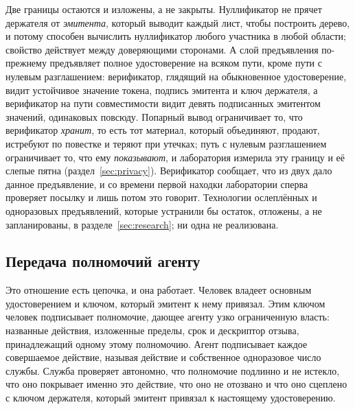 Две границы остаются и изложены, а не закрыты. Нуллификатор не прячет держателя от
\emph{эмитента}, который выводит каждый лист, чтобы построить дерево, и потому способен вычислить
нуллификатор любого участника в любой области; свойство действует между доверяющими сторонами. А
слой предъявления по-прежнему предъявляет полное удостоверение на всяком пути, кроме пути с нулевым
разглашением: верификатор, глядящий на обыкновенное удостоверение, видит устойчивое значение
токена, подпись эмитента и ключ держателя, а верификатор на пути совместимости видит девять
подписанных эмитентом значений, одинаковых повсюду. Попарный вывод ограничивает то, что верификатор
\emph{хранит}, то есть тот материал, который объединяют, продают, истребуют по повестке и теряют
при утечках; путь с нулевым разглашением ограничивает то, что ему \emph{показывают}, и лаборатория
измерила эту границу и её слепые пятна (раздел~\ref{sec:privacy}). Верификатор сообщает, что из
двух дало данное предъявление, и со времени первой находки лаборатории сперва проверяет посылку и
лишь потом это говорит. Технологии ослеплённых и одноразовых предъявлений, которые устранили бы
остаток, отложены, а не запланированы, в разделе~\ref{sec:research}; ни одна не реализована. \sFut

\subsection{Передача полномочий агенту}

Это отношение есть цепочка, и она работает. Человек владеет основным удостоверением и ключом,
который эмитент к нему привязал. Этим ключом человек подписывает полномочие, дающее агенту узко
ограниченную власть: названные действия, изложенные пределы, срок и дескриптор отзыва,
принадлежащий одному этому полномочию. Агент подписывает каждое совершаемое действие, называя
действие и собственное одноразовое число службы. Служба проверяет автономно, что полномочие
подлинно и не истекло, что оно покрывает именно это действие, что оно не отозвано и что оно
сцеплено с ключом держателя, который эмитент привязал к настоящему удостоверению. \sImpl


